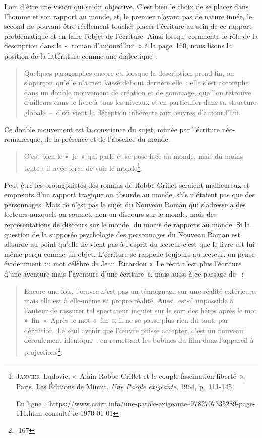 Loin d'être une vision qui se dit objective. C'est bien le choix de se placer dans l'homme et son rapport au monde, et, le premier n'ayant pas de nature innée, le second ne pouvant être réellement touché, placer l'écriture au sein de ce rapport problématique et en faire l'objet de l'écriture. Ainsi lorsqu'\robbe{} commente le rôle de la description dans le «~roman d'aujourd'hui~» à la page~160, nous lisons la position de la littérature comme une dialectique~:
\begin{quote}
Quelques paragraphes encore et, lorsque la description prend fin, on s’aperçoit qu’elle n’a rien laissé debout derrière elle~: elle s’est accomplie dans un double mouvement de création et de gommage, que l’on retrouve d’ailleurs dans le livre à tous les niveaux et en particulier dans sa structure globale~–~d’où vient la déception inhérente aux œuvres d’aujourd’hui.
\end{quote}
Ce double mouvement est la conscience du sujet, mimée par l'écriture néo-romanesque, de la présence et de l'absence du monde.
\begin{quote}
     C’est bien le «~je~» qui parle et se pose face au monde, mais du moins tente-t-il avec force de voir le monde\footnote{\textsc{Janvier}~Ludovic, «~Alain Robbe-Grillet et le couple fascination-liberté~», Paris, Les Éditions de Minuit, \textit{Une Parole exigeante}, 1964, p.~111-145

En ligne~: https://www.cairn.info/une-parole-exigeante--9782707335289-page-111.htm; consulté le \today}.
\end{quote}
Peut-être les protagonistes des romans de Robbe-Grillet seraient malheureux et empreints d'un rapport tragique ou absurde au monde, s'ils n'étaient pas que des personnages. Mais ce n'est pas le sujet du Nouveau Roman qui s'adresse à des lecteurs auxquels on soumet, non un discours sur le monde, mais des représentations de discours sur le monde, du moins de rapports au monde. Si la question de la supposée psychologie des personnages du Nouveau Roman est absurde au point qu'elle ne vient pas à l'esprit du lecteur c'est que le livre est lui-même perçu comme un objet. L'écriture se rappelle toujours au lecteur, on pense évidemment au mot célèbre de Jean~Ricardou «~Le récit n'est plus l'écriture d'une aventure mais l'aventure d'une écriture~», mais aussi à ce passage de \punr~:
\begin{quote}
    Encore une fois, l’œuvre n’est pas un témoignage sur une réalité extérieure, mais elle est à elle-même sa propre réalité. Aussi, est-il impossible à l’auteur de rassurer tel spectateur inquiet sur le sort des héros après le mot «~fin~». Après le mot «~fin~», il ne se passe plus rien du tout, par définition. Le seul avenir que l’œuvre puisse accepter, c’est un nouveau déroulement identique~: en remettant les bobines du film dans l’appareil à projections\footnote{-167}.
\end{quote}
